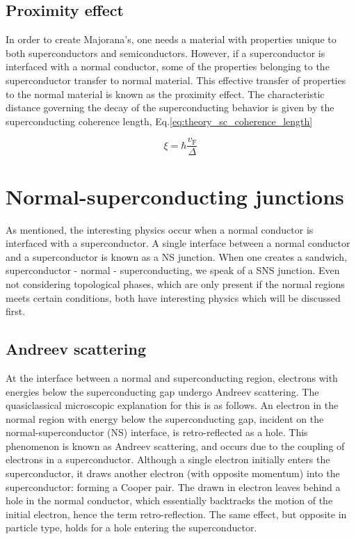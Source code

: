 	\subsection{Proximity effect}
		In order to create Majorana's, one needs a material with properties unique to both superconductors and semiconductors.
		However, if a superconductor is interfaced with a normal conductor, some of the properties belonging to the superconductor transfer to normal material.
		This effective transfer of properties to the normal material is known as the proximity effect.
		The characteristic distance governing the decay of the superconducting behavior is given by the superconducting coherence length, Eq.\eqref{eq:theory_sc_coherence_length}
		
		\begin{equation}
			\xi = \hbar \frac{v_\text{F}}{\Delta}
			\label{eq:theory_sc_coherence_length}
		\end{equation}


\section{Normal-superconducting junctions}
	As mentioned, the interesting physics occur when a normal conductor is interfaced with a superconductor.
	A single interface between a normal conductor and a superconductor is known as a NS junction.
	When one creates a sandwich, superconductor - normal - superconducting, we speak of a SNS junction.
	Even not considering topological phases, which are only present if the normal regions meets certain conditions, both have interesting physics which will be discussed first.


	\subsection{Andreev scattering}
		At the interface between a normal and superconducting region, electrons with energies below the superconducting gap undergo Andreev scattering.
		The quasiclassical microscopic explanation for this is as follows.
		An electron in the normal region with energy below the superconducting gap, incident on the normal-superconductor (NS) interface, is retro-reflected as a hole.
		This phenomenon is known as Andreev scattering, and occurs due to the coupling of electrons in a superconductor.
		Although a single electron initially enters the superconductor, it draws another electron (with opposite momentum) into the superconductor: forming a Cooper pair.
		The drawn in electron leaves behind a hole in the normal conductor, which essentially backtracks the motion of the initial electron, hence the term retro-reflection.
		The same effect, but opposite in particle type, holds for a hole entering the superconductor.

